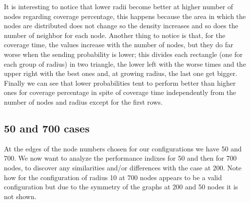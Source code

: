 It is interesting to notice that lower radii become better at higher number of nodes regarding coverage percentage, this happens because the area in which the nodes are distributed does not change so the density increases and so does the number of neighbor for each node. 
Another thing to notice is that, for the coverage time, the values increase with the number of nodes, but they do far worse when the sending probability is lower; this divides each rectangle (one for each group of radius) in two triangle, the lower left with the worse times and the upper right with the best ones and, at growing radius, the last one get bigger.
Finally we can see that lower probabilities tent to perform better than higher ones for coverage percentage in spite of coverage time independently from the number of nodes and radius except for the first rows.


\subsection{50 and 700 cases}

At the edges of the node numbers chosen for our configurations we have 50 and 700. We now want to analyze the performance indixes for 50 and then for 700 nodes, to discover any similarities and/or differences with the case at 200. Note how for the configuration of radius 10 at 700 nodes appears to be a valid configuration but due to the symmetry of the graphs at 200 and 50 nodes it is not shown.

